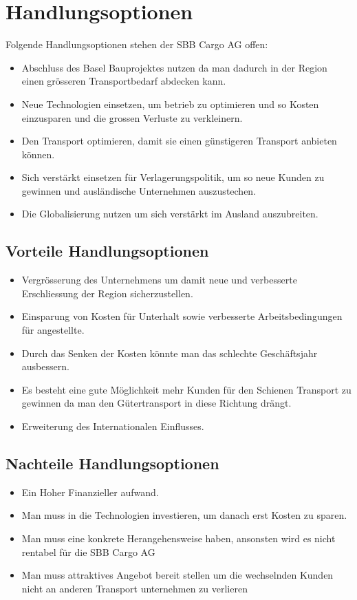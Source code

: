 \documentclass{article}
\begin{document}
\section{Handlungsoptionen}

Folgende Handlungsoptionen stehen der SBB Cargo AG offen:

\begin{itemize}
    \item Abschluss des Basel Bauprojektes nutzen da man dadurch in der Region einen grösseren Transportbedarf abdecken kann. 
    \item Neue Technologien einsetzen, um betrieb zu optimieren und so Kosten einzusparen und die grossen Verluste zu verkleinern. 
    \item Den Transport optimieren, damit sie einen günstigeren Transport anbieten können. 
    \item Sich verstärkt einsetzen für Verlagerungspolitik, um so neue Kunden zu gewinnen und ausländische Unternehmen auszustechen. 
    \item Die Globalisierung nutzen um sich verstärkt im Ausland auszubreiten. 
\end{itemize}

\subsection{Vorteile Handlungsoptionen}
\begin{itemize}
    \item Vergrösserung des Unternehmens um damit neue und verbesserte Erschliessung der Region sicherzustellen. 
    \item Einsparung von Kosten für Unterhalt sowie verbesserte Arbeitsbedingungen für angestellte. 
    \item Durch das Senken der Kosten könnte man das schlechte Geschäftsjahr ausbessern. 
    \item Es besteht eine gute Möglichkeit mehr Kunden für den Schienen Transport zu gewinnen da man den Gütertransport in diese Richtung drängt. 
    \item Erweiterung des Internationalen Einflusses. 
\end{itemize}

\subsection{Nachteile Handlungsoptionen}
\begin{itemize}
    \item Ein Hoher Finanzieller aufwand.
    \item Man muss in die Technologien investieren, um danach erst Kosten zu sparen. 
    \item Man muss eine konkrete Herangehensweise haben, ansonsten wird es nicht rentabel für die SBB Cargo AG 
    \item Man muss attraktives Angebot bereit stellen um die wechselnden Kunden nicht an anderen Transport unternehmen zu verlieren 
\end{itemize}
\end{document}
